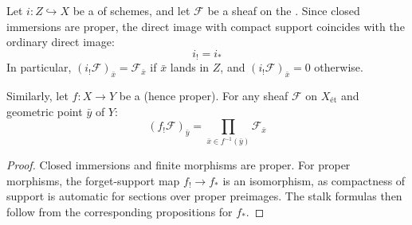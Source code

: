 \begin{proposition} \label{proposition:compactly_supported_direct_image_under_closed_and_finite_morphisms_etale}
    Let $i : Z \hookrightarrow X$ be a  of schemes, and let $\mathcal{F}$ be a sheaf on the . Since closed immersions are proper, the direct image with compact support coincides with the ordinary direct image:
    $$i_! = i_*$$
    In particular, $(i_!\mathcal{F})_{\bar{x}} = \mathcal{F}_{\bar{x}}$ if $\bar{x}$ lands in $Z$, and $(i_!\mathcal{F})_{\bar{x}} = 0$ otherwise.

    Similarly, let $f : X \to Y$ be a  (hence proper). For any sheaf $\mathcal{F}$ on $X_{\text{ét}}$ and geometric point $\bar{y}$ of $Y$:
    $$(f_!\mathcal{F})_{\bar{y}} = \prod_{\bar{x} \in f^{-1}(\bar{y})} \mathcal{F}_{\bar{x}}$$
\end{proposition}
\begin{proof}
    Closed immersions and finite morphisms are proper. For proper morphisms, the forget-support map $f_! \to f_*$ is an isomorphism, as compactness of support is automatic for sections over proper preimages. The stalk formulas then follow from the corresponding propositions for $f_*$.
\end{proof}
